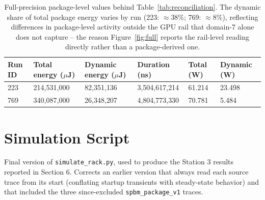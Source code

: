 \documentclass[10pt]{article}
\begin{document}
\begin{table}[h]
\centering
\small
\begin{tabularx}{\textwidth}{lXXXXX}
\toprule
\textbf{Run ID} & \textbf{Total energy ($\mu$J)} & \textbf{Dynamic energy ($\mu$J)} & \textbf{Duration (ns)} & \textbf{Total (W)} & \textbf{Dynamic (W)} \\
\midrule
223 & 214{,}531{,}000 & 82{,}351{,}136 & 3{,}504{,}617{,}214 & 61.214 & 23.498 \\
769 & 340{,}087{,}000 & 26{,}348{,}207 & 4{,}804{,}773{,}330 & 70.781 & 5.484 \\
\bottomrule
\end{tabularx}
\vspace{-2pt}
\caption{Full-precision package-level values behind Table~\ref{tab:reconciliation}.
The dynamic share of total package energy varies by run (223:
$\approx$38\%; 769: $\approx$8\%), reflecting differences in package-level
activity outside the GPU rail that domain-7 alone does not capture -- the
reason Figure~\ref{fig:full} reports the rail-level reading directly rather than a
package-derived one.}
\label{tab:variance-precision}
\end{table}

\section{Simulation Script}
\label{app:script}

Final version of \texttt{simulate\_rack.py}, used to produce the Station 3
results reported in Section 6. Corrects an earlier version that always read
each source trace from its start (conflating startup transients with
steady-state behavior) and that included the three since-excluded
\texttt{spbm\_package\_v1} traces.


\end{document}
